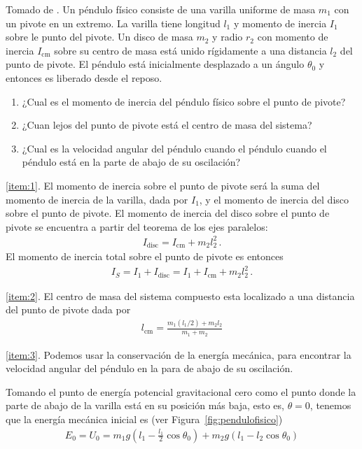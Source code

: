 \ejemplo{}
 Tomado de \cite{mit2009}. Un péndulo físico consiste de una varilla uniforme de masa $m_1$ con un pivote en un extremo. La varilla tiene longitud $l_1$ y momento de inercia $I_1$  sobre le punto del pivote. Un disco de masa $m_2$ y radio $r_2$ con momento de inercia $I_{\text{cm}}$ sobre su centro de masa está unido rígidamente a una distancia $l_2$ del punto de pivote. El péndulo está inicialmente desplazado a un ángulo $\theta_0$ y entonces es liberado desde el reposo.
  \begin{enumerate}
  \item ¿Cual es el momento de inercia del péndulo físico sobre el punto de pivote?
    \label{item:1}
  \item ¿Cuan lejos del punto de pivote está el centro de masa del sistema?
    \label{item:2}
  \item ¿Cual es la velocidad angular del péndulo cuando el péndulo cuando el péndulo está en la parte de abajo de su oscilación?
\label{item:3}
  \end{enumerate}
\ref{item:1}. El momento de inercia sobre el punto de pivote será la suma del momento de inercia de la varilla, dada por $I_1$, y el momento de inercia del disco sobre el punto de pivote. El momento de inercia del disco sobre el punto de pivote se encuentra a partir del teorema de los ejes paralelos:
\begin{align}
  I_{\text{disc}}=I_{\text{cm}}+m_2 l_2^2\,.
\end{align}
El momento de inercia total sobre el punto de pivote es entonces
\begin{align}
  \label{eq:rig3}
  I_S=I_1+I_{\text{disc}}=I_1+I_{\text{cm}}+m_2 l_2^2\,.
\end{align}

\ref{item:2}. El centro de masa del sistema compuesto esta localizado a una distancia del punto de pivote dada por
\begin{align}
  \label{eq:rig5}
  l_{\text{cm}}=\frac{m_1(l_1/2)+m_2 l_2}{m_1+m_2}
\end{align}

\ref{item:3}. Podemos usar la conservación de la energía mecánica, para encontrar la velocidad angular del péndulo en la para de abajo de su oscilación. 

Tomando el punto de energía potencial gravitacional cero como el punto donde la parte de abajo de la varilla está en su posición más baja, esto es, $\theta=0$, tenemos que la energía mecánica inicial es (ver Figura~\ref{fig:pendulofisico})
\begin{align}
  E_0=U_0=m_1 g  \left(l_1-\frac{l_1}{2}\cos\theta_0  \right)
+m_2 g  \left(l_1-l_2\cos\theta_0  \right)
\end{align}

